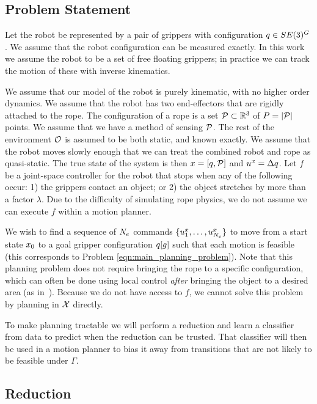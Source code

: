 \subsection{Problem Statement}
Let the robot be represented by a pair of grippers with configuration $q \in SE(3)^G$. We assume that the robot configuration can be measured exactly. In this work we assume the robot to be a set of free floating grippers; in practice we can track the motion of these with inverse kinematics.

We assume that our model of the robot is purely kinematic, with no higher order dynamics. We assume that the robot has two end-effectors that are rigidly attached to the rope. The configuration of a rope is a set $\mathcal{P} \subset \mathbb{R}^3$ of $P = | \mathcal{P} |$ points. We assume that we have a method of sensing $\mathcal{P}$. The rest of the environment $\mathcal{O}$ is assumed to be both static, and known exactly. We assume that the robot moves slowly enough that we can treat the combined robot and rope as quasi-static. The true state of the system is then $x = [q,\mathcal{P}]$ and $u^x = \Delta q$. Let $f$ be a joint-space controller for the robot that stops when any of the following occur: 1) the grippers contact an object; or 2) the object stretches by more than a factor $\lambda$. Due to the difficulty of simulating rope physics, we do not assume we can execute $f$ within a motion planner.

We wish to find a sequence of $N_e$ commands $\{u^x_1, \dots, u^x_{N_e} \}$ to move from a start state $x_0$ to a goal gripper configuration $q[g]$ such that each motion is feasible (this corresponds to Problem \eqref{eqn:main_planning_problem}). Note that this planning problem does not require bringing the rope to a specific configuration, which can often be done using local control \textit{after} bringing the object to a desired area (as in~\cite{McConachie2020}). Because we do not have access to $f$, we cannot solve this problem by planning in $\mathcal{X}$ directly.

To make planning tractable we will perform a reduction and learn a classifier from data to predict when the reduction can be trusted. That classifier will then be used in a motion planner to bias it away from transitions that are not likely to be feasible under $\Gamma$.

\subsection{Reduction}

